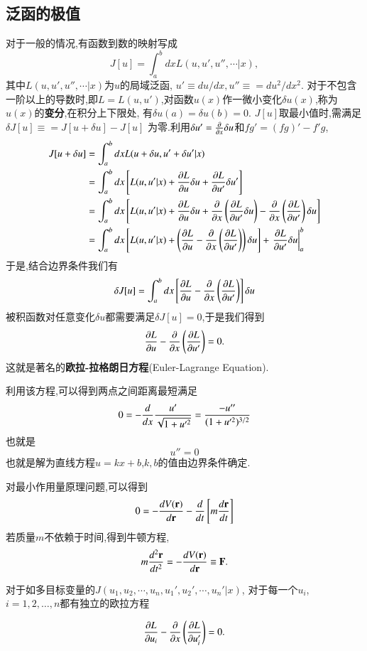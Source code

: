 \subsection{泛函的极值}

对于一般的情况,有函数到数的映射写成
\begin{equation}
  J[u] = \int_{a}^{b}  dx L(u, u', u'', \cdots| x), 
\end{equation}
其中$L(u, u', u'',\cdots | x)$为$u$的局域泛函, $u' \equiv du/dx, u'' \equiv = du^2/dx^2$.
对于不包含一阶以上的导数时,即$L = L(u,u')$,对函数$u(x)$作一微小变化$\delta u(x)$,称为$u(x)$的\textbf{变分},在积分上下限处,
有$\delta u(a) = \delta u(b) = 0$. $J[u]$取最小值时,需满足$\delta J[u] \equiv = J[u + \delta u] - J[u]$
为零.利用$\delta u' = \frac{\partial{}}{\partial{x}} \delta u$和$fg' = (fg)' - f'g$,
\begin{align}
  J[u + \delta u] &= \int_{a}^{b}  dx L(u + \delta u, u' + \delta u'| x) 
    \nonumber \\ 
    &= \int_{a}^{b} dx \left[ L(u, u'| x) + \funcpd{L}{u} \delta u + \funcpd{L}{u'} \delta u' \right]  
    \nonumber \\ 
    &= \int_{a}^{b} dx \left[ L(u, u'| x) + \funcpd{L}{u} \delta u + \funcpd{}{x}\left( \funcpd{L}{u'} \delta u \right)
    -  \funcpd{}{x}\left( \funcpd{L}{u'} \right) \delta u  \right]  
    \nonumber \\ 
    &= \int_{a}^{b} dx \left[ L(u, u'| x) + \left( \funcpd{L}{u} -  \funcpd{}{x}\left( \funcpd{L}{u'} \right)   \right) \delta u \right]  
        + \left. \funcpd{L}{u'} \delta u \right|_{a}^{b} 
     \nonumber %
\end{align}
于是,结合边界条件我们有
\begin{align}
  \delta J[u] = \int_{a}^{b} dx \left[ \frac{\partial{L}}{\partial{u}} -  \frac{\partial{}}{\partial{x}}\left( \frac{\partial{L}}{\partial{u'}} \right)   \right] \delta u 
\end{align}
被积函数对任意变化$\delta u$都需要满足$\delta J[u] = 0$,于是我们得到
\begin{equation}
  \frac{\partial{L}}{\partial{u}} -  \frac{\partial{}}{\partial{x}}\left( \frac{\partial{L}}{\partial{u'}} \right) = 0 .
\end{equation}
这就是著名的\textbf{欧拉-拉格朗日方程}(Euler-Lagrange Equation).

利用该方程,可以得到两点之间距离最短满足
\[
  0 = - \frac{d{}}{d{x}} \frac{u'}{\sqrt{1 + u'^2}} = \frac{-u''}{(1+ u'^2)^{3/2}}
\]
也就是
\[ u'' = 0\]
也就是解为直线方程$ u = k x + b$,$k,b$的值由边界条件确定.

对最小作用量原理问题,可以得到
\[
  0 = - \frac{d{V({\mathbf{r}})}}{d{{\mathbf{r}}}} - \frac{d{}}{d{t}} \left[ m \frac{d{\mathbf{r}}}{dt} \right]
\]
若质量$m$不依赖于时间,得到牛顿方程,
\[
  m \frac{d^2{\mathbf{r}}}{dt^2} = - \frac{d{V({\mathbf{r}})}}{d{{\mathbf{r}}}} \equiv {\mathbf{F}} .
\]

对于如多目标变量的$J(u_1, u_2, \cdots, u_n, u_1', u_2', \cdots, u_n'|x)$, 对于每一个$u_i$, $i=1,2,\dots,n$都有独立的欧拉方程

\begin{equation}
  \frac{\partial{L}}{\partial{u_i}} -  \frac{\partial{}}{\partial{x}}\left( \frac{\partial{L}}{\partial{u'_i}} \right) = 0 .
\end{equation}






